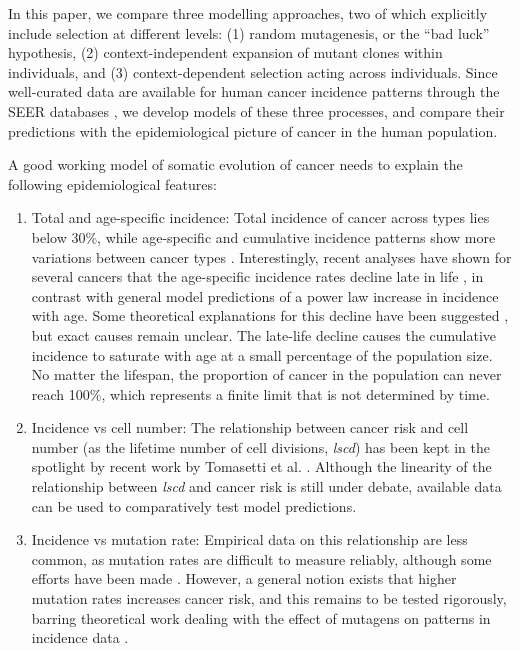 \documentclass[9pt,twocolumn,twoside]{pnas-new}
\begin{document}
In this paper, we compare three modelling approaches, two of which explicitly include selection at different levels: (1) random mutagenesis, or the ``bad luck'' hypothesis, (2) context-independent expansion of mutant clones within individuals, and (3) context-dependent selection acting across individuals. Since well-curated data are available for human cancer incidence patterns through the SEER databases \cite{AmericanCancerSociety2016}, we develop models of these three processes, and compare their predictions with the epidemiological picture of cancer in the human population.

A good working model of somatic evolution of cancer needs to explain the following epidemiological features:

\begin{enumerate}
	\item Total and age-specific incidence: Total incidence of cancer across types lies below 30\%, while age-specific and cumulative incidence patterns show more variations between cancer types \cite{AmericanCancerSociety2016}. Interestingly, recent analyses have shown for several cancers that the age-specific incidence rates decline late in life \cite{Harding2012}, in contrast with general model predictions of a power law increase in incidence with age. Some theoretical explanations for this decline have been suggested \cite{Frank2007}, but exact causes remain unclear. The late-life decline causes the cumulative incidence to saturate with age at a small percentage of the population size. No matter the lifespan, the proportion of cancer in the population can never reach 100\%, which represents a finite limit that is not determined by time.
	\item Incidence vs cell number: The relationship between cancer risk and cell number (as the lifetime number of cell divisions, \textit{lscd}) has been kept in the spotlight by recent work by Tomasetti et al. \cite{Tomasetti78, Tomasetti2017}. Although the linearity of the relationship between \textit{lscd} and cancer risk is still under debate, available data can be used to comparatively test model predictions.
	\item Incidence vs mutation rate: Empirical data on this relationship are less common, as mutation rates are difficult to measure reliably, although some efforts have been made \cite{Hao2016}. However, a general notion exists that higher mutation rates increases cancer risk, and this remains to be tested rigorously, barring theoretical work dealing with the effect of mutagens on patterns in incidence data \cite{Frank2007}.

\end{enumerate}
\end{document}

